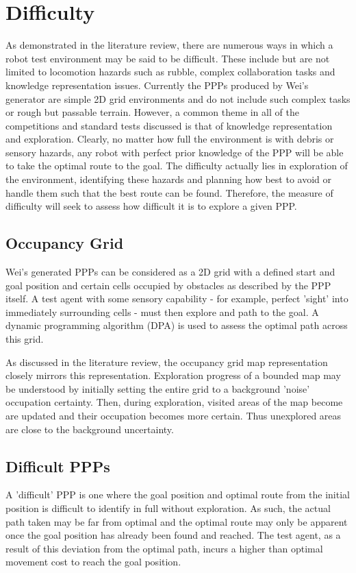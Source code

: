 \documentclass[authoryearcitations]{UoYCSproject}
\begin{document}
\section{Difficulty}
\label{sec:pa3}
As demonstrated in the literature review, there are numerous ways in which a robot test environment may be said to be difficult. These include but are not limited to locomotion hazards such as rubble, complex collaboration tasks and knowledge representation issues. Currently the PPPs produced by Wei's generator are simple 2D grid environments and do not include such complex tasks or rough but passable terrain. However, a common theme in all of the competitions and standard tests discussed is that of knowledge representation and exploration. Clearly, no matter how full the environment is with debris or sensory hazards, any robot with perfect prior knowledge of the PPP will be able to take the optimal route to the goal. The difficulty actually lies in exploration of the environment, identifying these hazards and planning how best to avoid or handle them such that the best route can be found. Therefore, the measure of difficulty will seek to assess how difficult it is to explore a given PPP.

\subsection{Occupancy Grid}
\label{sec:pa3_occ_grid}
Wei's generated PPPs can be considered as a 2D grid with a defined start and goal position and certain cells occupied by obstacles as described by the PPP itself. A test agent with some sensory capability - for example, perfect 'sight' into immediately surrounding cells - must then explore and path to the goal. A dynamic programming algorithm (DPA) is used to assess the optimal path across this grid.

As discussed in the literature review, the occupancy grid map representation closely mirrors this representation. Exploration progress of a bounded map may be understood by initially setting the entire grid to a background 'noise' occupation certainty. Then, during exploration, visited areas of the map become are updated and their occupation becomes more certain. Thus unexplored areas are close to the background uncertainty.

\subsection{Difficult PPPs}
\label{sec:pa3_difficult}
A 'difficult' PPP is one where the goal position and optimal route from the initial position is difficult to identify in full without exploration. As such, the actual path taken may be far from optimal and the optimal route may only be apparent once the goal position has already been found and reached. The test agent, as a result of this deviation from the optimal path, incurs a higher than optimal movement cost to reach the goal position.
\end{document}
